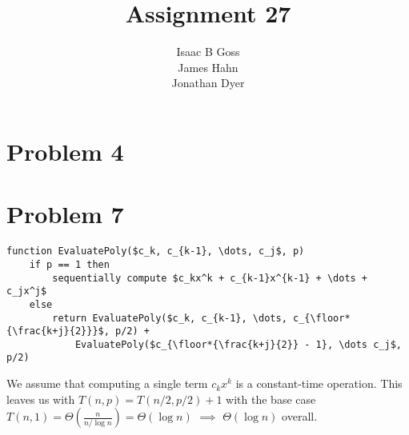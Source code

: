 \documentclass{article}
\author{Isaac B Goss\\ James Hahn\\ Jonathan Dyer}
\title{Assignment 27}
\providecommand{\prob}[1]{\section*{Problem #1}}
\DeclarePairedDelimiter\floor{\lfloor}{\rfloor}
\begin{document}
\maketitle

\prob{4}

\prob{7}
    \begin{lstlisting}
function EvaluatePoly($c_k, c_{k-1}, \dots, c_j$, p)
    if p == 1 then
        sequentially compute $c_kx^k + c_{k-1}x^{k-1} + \dots + c_jx^j$
    else
        return EvaluatePoly($c_k, c_{k-1}, \dots, c_{\floor*{\frac{k+j}{2}}}$, p/2) + 
            EvaluatePoly($c_{\floor*{\frac{k+j}{2}} - 1}, \dots c_j$, p/2)
    \end{lstlisting}

    We assume that computing a single term $c_kx^k$ is a constant-time operation.
    This leaves us with $T(n, p) = T(n/2, p/2) + 1$ with the base case $T(n, 1) = \Theta(\frac{n}{n/\log n}) = \Theta(\log n)$ $\implies$ $\Theta(\log n)$ overall.
\end{document}
